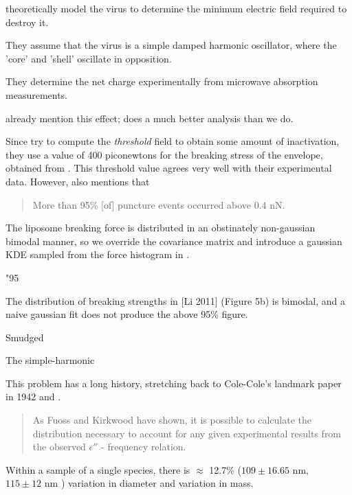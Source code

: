 \documentclass[paper.tex]{subfiles}
\begin{document}
	
	

\cite{Efficient2015} theoretically model the virus to determine the minimum electric field required to destroy it. 

They assume that the virus is a simple damped harmonic oscillator, where the 'core' and 'shell' oscillate in opposition. 

They determine the net charge experimentally from microwave absorption measurements.

\cite{Microwave2009} already mention this effect; \cite{Elastic} does a much better analysis than we do.

Since \cite{Efficient2015} try to compute the {\it threshold} field to obtain some amount of inactivation, they use a value of 400 piconewtons for the breaking stress of the envelope, obtained from \cite{Bending2011}. This threshold value agrees very well with their experimental data. However, \cite{Bending2011} also mentions that 

\begin{quote}
	More than 95\% [of] puncture events occurred above 0.4 nN.
\end{quote}



The liposome breaking force is distributed in an obstinately non-gaussian bimodal manner, so we override the covariance matrix and introduce a gaussian KDE sampled from the force histogram in \cite{Bending2011}.



"95%

The distribution of breaking strengths in [Li 2011] (Figure 5b) is bimodal, and a naive gaussian fit does not produce the above 95\% figure.

Smudged 



The simple-harmonic

This problem has a long history, stretching back to Cole-Cole's landmark paper in 1942\cite{Dispersion1941} and \cite{Electrical1941}. 

\begin{quote}
	As Fuoss and Kirkwood have shown, it is possible to calculate the distribution necessary to account for any given experimental results from the observed $\epsilon''$ - frequency relation.
\end{quote}

Within a sample of a single species, there is $\approx$ 12.7\%  ($109 \pm 16.65 \text{ nm}$\cite{lauffer1944biophysical}, $115 \pm 12 \text{ nm}$ \cite{Characterization1984}) variation in diameter and  \cite{Characterization1984} variation in mass.
\end{document}

